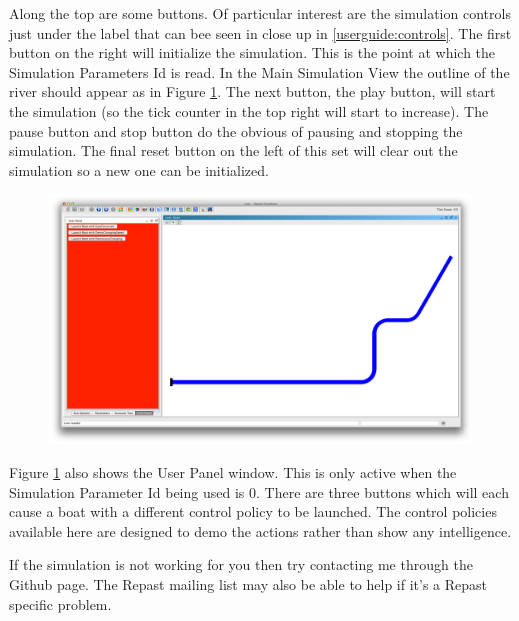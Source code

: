 Along the top are some buttons. Of particular interest are the simulation controls just under the label that can bee seen in close up in \ref{userguide:controls}. The first button on the right will initialize the simulation. This is the point at which the Simulation Parameters Id is read. In the Main Simulation View the outline of the river should appear as in Figure \ref{userguide:interactivemodeinitialized}. The next button, the play button, will start the simulation (so the tick counter in the top right will start to increase). The pause button and stop button do the obvious of pausing and stopping the simulation. The final reset button on the left of this set will clear out the simulation so a new one can be initialized.

\begin{figure}
\begin{center}
  \includegraphics[scale=0.2]{images/screenshots/interactivemodeinitialized.png}
  \caption{}
  \label{userguide:interactivemodeinitialized}
\end{center}
\end{figure}

Figure \ref{userguide:interactivemodeinitialized} also shows the User Panel window. This is only active when the Simulation Parameter Id being used is 0. There are three buttons which will each cause a boat with a different control policy to be launched. The control policies available here are designed to demo the actions rather than show any intelligence.

If the simulation is not working for you then try contacting me through the Github page. The Repast mailing list may also be able to help if it's a Repast specific problem.